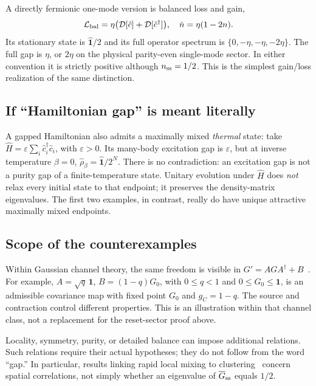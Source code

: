 \documentclass[aps,prb,twocolumn,nofootinbib,superscriptaddress]{revtex4-2}
\newcommand{\Id}{\hat{\mathbf{1}}}
\newcommand{\id}{\mathbf{1}}
\newcommand{\D}{\mathcal D}
\newcommand{\Lind}{\mathcal L}
\begin{document}
A directly fermionic one-mode version is balanced loss and gain,
\begin{equation}
 \Lind_{\rm bal}=\eta\bigl(\D[\hat c]+\D[\hat c^\dagger]\bigr),
 \quad \dot n=\eta(1-2n).
\end{equation}
Its stationary state is $\Id/2$ and its full operator spectrum is
$\{0,-\eta,-\eta,-2\eta\}$. The full gap is $\eta$, or $2\eta$
on the physical parity-even single-mode sector. In either convention
it is strictly positive although $n_{\rm ss}=1/2$. This is the simplest
gain/loss realization of the same distinction.

\subsection{If ``Hamiltonian gap'' is meant literally}
A gapped Hamiltonian also admits a maximally mixed \emph{thermal} state:
take $\hat H=\varepsilon\sum_i\hat c_i^\dagger\hat c_i$, with
$\varepsilon>0$. Its many-body excitation gap is $\varepsilon$,
but at inverse temperature $\beta=0$, $\hat\rho_\beta=\Id/2^N$.
There is no contradiction: an excitation gap is not a purity gap of
a finite-temperature state. Unitary evolution under $\hat H$ does
\emph{not} relax every initial state to that endpoint; it preserves the
density-matrix eigenvalues. The first two examples, in contrast,
really do have unique attractive maximally mixed endpoints.

\subsection{Scope of the counterexamples}

Within Gaussian channel theory, the same freedom is visible in
$G'=AGA^\dagger+B$~\cite{DFP}. For example,
$A=\sqrt q\,\id$, $B=(1-q)G_0$, with $0\le q<1$ and
$0\le G_0\le\id$, is an admissible covariance map with fixed point
$G_0$ and $g_C=1-q$. The source and contraction control different
properties. This is an illustration within that channel class, not a
replacement for the reset-sector proof above.

Locality, symmetry, purity, or detailed balance can impose additional
relations. Such relations require their actual hypotheses; they do not
follow from the word ``gap.'' In particular, results linking rapid local
mixing to clustering~\cite{KE} concern spatial correlations, not simply
whether an eigenvalue of $\overline G_{\rm ss}$ equals $1/2$.
\end{document}
